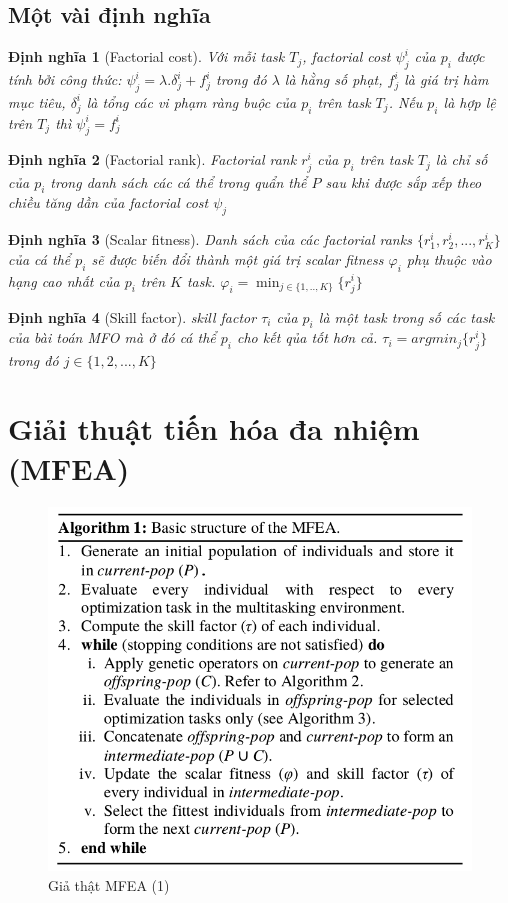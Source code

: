 \documentclass[a4paper,12pt]{report}
\newtheorem{definition}{Định nghĩa}[chapter]
\begin{document}
\subsection{Một vài định nghĩa}
\begin{definition}[Factorial cost]
Với mỗi task $T_j$, factorial cost $\psi_j^i$ của $p_i$ được tính bởi công thức: $\psi_j^i = \lambda . \delta_j^i + f_j^i$ trong đó $\lambda$ là hằng số phạt, $f_j^i$ là giá trị hàm mục tiêu, $\delta_j^i$ là tổng các vi phạm ràng buộc của $p_i$ trên task $T_j$. Nếu $p_i$ là hợp lệ trên $T_j$ thì $\psi_j^i = f_j^i$
\end{definition}

\begin{definition}[Factorial rank]
Factorial rank $r_j^i$ của $p_i$ trên task $T_j$ là chỉ số của $p_i$ trong danh sách các cá thể trong quẩn thể $P$ sau khi được sắp xếp theo chiều tăng dần của 	factorial cost $\psi_j$
\end{definition}

\begin{definition}[Scalar fitness]
Danh sách của các factorial ranks $\{r_1^i, r_2^i, ..., r_K^i\}$ của cá thể $p_i$ sẽ được biến đổi thành một giá trị scalar fitness $\varphi_i$ phụ thuộc vào hạng cao nhất của $p_i$ trên $K$ task. $\varphi_i = \displaystyle\min_{j \in \{1,..,K\}} \{r_j^i\}$ 
\end{definition}

\begin{definition}[Skill factor]
skill factor $\tau_i$ của $p_i$ là một task trong số các task của bài toán MFO mà ở đó cá thể $p_i$ cho kết qủa tốt hơn cả. $\tau_i = argmin_j\{r_j^i\}$ trong đó $j \in \{1, 2, ..., K\}$
\end{definition}

\section{Giải thuật tiến hóa đa nhiệm (MFEA)}
\begin{figure}[H]
\centering 
\includegraphics[scale=0.8]{al1.png}
\caption{Giả thật MFEA (1)}
\end{figure} 
\end{document}
